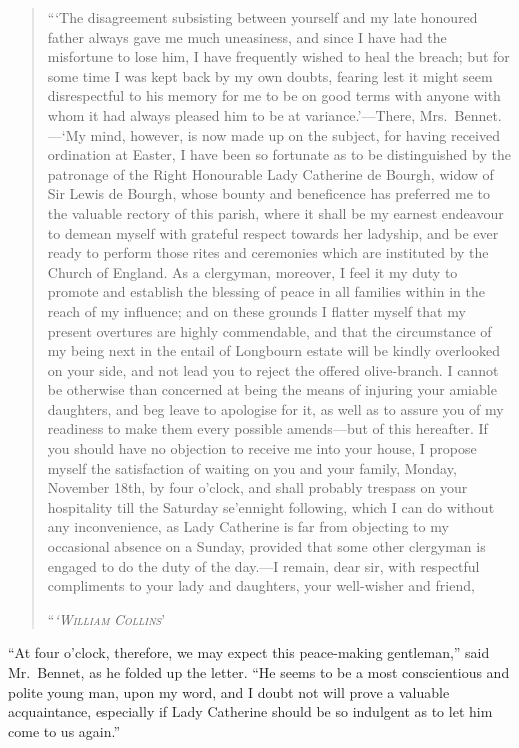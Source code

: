 \documentclass[12pt,english,oneside]{book}
\newcommand{\noun}[1]{\textsc{#1}}
\begin{document}
\begin{quotation}
{}```The disagreement subsisting between yourself and my late honoured
father always gave me much uneasiness, and since I have had the misfortune
to lose him, I have frequently wished to heal the breach; but for
some time I was kept back by my own doubts, fearing lest it might
seem disrespectful to his memory for me to be on good terms with anyone
with whom it had always pleased him to be at variance.'\mbox{---}There,
Mrs.\ Bennet.\mbox{---}`My mind, however, is now made up on the
subject, for having received ordination at Easter, I have been so
fortunate as to be distinguished by the patronage of the Right Honourable
Lady Catherine de Bourgh, widow of Sir Lewis de Bourgh, whose bounty
and beneficence has preferred me to the valuable rectory of this parish,
where it shall be my earnest endeavour to demean myself with grateful
respect towards her ladyship, and be ever ready to perform those rites
and ceremonies which are instituted by the Church of England. As a
clergyman, moreover, I feel it my duty to promote and establish the
blessing of peace in all families within in the reach of my influence;
and on these grounds I flatter myself that my present overtures are
highly commendable, and that the circumstance of my being next in
the entail of Longbourn estate will be kindly overlooked on your side,
and not lead you to reject the offered olive-branch. I cannot be otherwise
than concerned at being the means of injuring your amiable daughters,
and beg leave to apologise for it, as well as to assure you of my
readiness to make them every possible amends\mbox{---}but of this
hereafter. If you should have no objection to receive me into your
house, I propose myself the satisfaction of waiting on you and your
family, Monday, November 18th, by four o'clock, and shall probably
trespass on your hospitality till the Saturday se'ennight following,
which I can do without any inconvenience, as Lady Catherine is far
from objecting to my occasional absence on a Sunday, provided that
some other clergyman is engaged to do the duty of the day.\mbox{---}I
remain, dear sir, with respectful compliments to your lady and daughters,
your well-wisher and friend,

``\textit{\emph{\noun{`William}}} \textit{\emph{\noun{Collins}}}'
\end{quotation}
{}``At four o'clock, therefore, we may expect this peace-making gentleman,''
said Mr.\ Bennet, as he folded up the letter. {}``He seems to be
a most conscientious and polite young man, upon my word, and I doubt
not will prove a valuable acquaintance, especially if Lady Catherine
should be so indulgent as to let him come to us again.''
\end{document}
